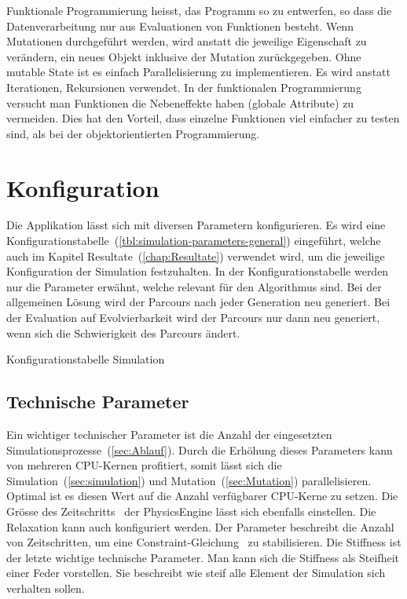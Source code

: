         Funktionale Programmierung heisst, das Programm so zu entwerfen,
        so dass die Datenverarbeitung nur aus Evaluationen von Funktionen besteht.
        Wenn Mutationen durchgeführt werden, wird anstatt die jeweilige Eigenschaft zu verändern,
        ein neues Objekt inklusive der Mutation zurückgegeben.
        Ohne mutable State ist es einfach Parallelisierung zu implementieren. %
        Es wird anstatt Iterationen, Rekursionen verwendet.
        In der funktionalen Programmierung versucht man Funktionen die Nebeneffekte haben (globale Attribute) zu vermeiden.
        Dies hat den Vorteil, dass einzelne Funktionen viel einfacher zu testen sind,
        als bei der objektorientierten Programmierung.

  \section{Konfiguration\label{sec:Konfiguration}}

    Die Applikation lässt sich mit diversen Parametern konfigurieren.
    Es wird eine Konfigurationstabelle~(\vref{tbl:simulation-parameters-general}) eingeführt,
    welche auch im Kapitel Resultate~(\vref{chap:Resultate}) verwendet wird,
    um die jeweilige Konfiguration der Simulation festzuhalten. In der Konfigurationstabelle werden nur die Parameter erwähnt,
    welche relevant für den Algorithmus sind. Bei der allgemeinen Lösung wird der Parcours
    nach jeder Generation neu generiert. Bei der Evaluation auf Evolvierbarkeit
    wird der Parcours nur dann neu generiert, wenn sich die Schwierigkeit des Parcours ändert.

    \begin{table}[H]
      
      \caption{Konfigurationstabelle Simulation\label{tbl:simulation-parameters-general}}
    \end{table}

    \subsection{Technische Parameter\label{sub:techParams}}

      Ein wichtiger technischer Parameter ist die Anzahl der eingesetzten Simulationsprozesse~(\vref{sec:Ablauf}).
      Durch die Erhöhung dieses Parameters kann von mehreren CPU-Kernen profitiert,
      somit lässt sich die Simulation~(\vref{sec:simulation}) und Mutation~(\vref{sec:Mutation}) parallelisieren.
      Optimal ist es diesen Wert auf die Anzahl verfügbarer CPU-Kerne zu setzen.
      Die Grösse des Zeitschritts~\cite{bullet:steppingTheWorld} der \gls{PhysicsEngine} lässt sich ebenfalls einstellen.
      Die Relaxation kann auch konfiguriert werden.
      Der Parameter beschreibt die Anzahl von Zeitschritten,
      um eine Constraint-Gleichung~\cite{gamedev:constraints} zu stabilisieren.
      Die Stiffness ist der letzte wichtige technische Parameter.
      Man kann sich die Stiffness als Steifheit einer Feder vorstellen.
      Sie beschreibt wie steif alle Element der Simulation sich verhalten sollen.


